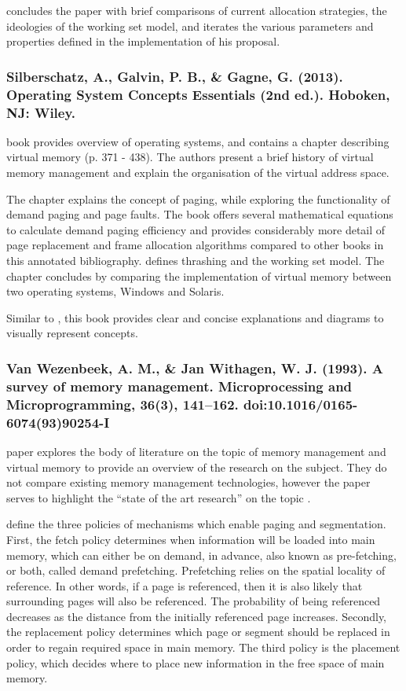 \citet{Denning1967} concludes the paper with brief comparisons of current allocation strategies, the ideologies of the working set model, and iterates the various parameters and properties defined in the implementation of his proposal.

\subsubsection*{Silberschatz, A., Galvin, P. B., \& Gagne, G. (2013). Operating System Concepts Essentials (2nd ed.). Hoboken, NJ: Wiley.}

 book provides overview of operating systems, and contains a chapter describing virtual memory (p. 371 - 438). The authors present a brief history of virtual memory management and explain the organisation of the virtual address space.

The chapter explains the concept of paging, while exploring the functionality of demand paging and page faults. The book offers several mathematical equations to calculate demand paging efficiency and provides considerably more detail of page replacement and frame allocation algorithms compared to other books in this annotated bibliography. \citet{Silberschatz2013} defines thrashing and the working set model. The chapter concludes by comparing the implementation of virtual memory between two operating systems, Windows and Solaris.

Similar to \citet{Jacob2008}, this book provides clear and concise explanations and diagrams to visually represent concepts.

\subsubsection*{Van Wezenbeek, A. M., \& Jan Withagen, W. J. (1993). A survey of memory management. Microprocessing and Microprogramming, 36(3), 141–162. doi:10.1016/0165-6074(93)90254-I}

 paper explores the body of literature on the topic of memory management and virtual memory to provide an overview of the research on the subject. They do not compare existing memory management technologies, however the paper serves to highlight the ``state of the art research'' on the topic \citep[p. 141]{VanWezenbeek1993}.

\citet{VanWezenbeek1993} define the three policies of mechanisms which enable paging and segmentation. First, the fetch policy determines when information will be loaded into main memory, which can either be on demand, in advance, also known as pre-fetching, or both, called demand prefetching. Prefetching relies on the spatial locality of reference. In other words, if a page is referenced, then it is also likely that surrounding pages will also be referenced. The probability of being referenced decreases as the distance from the initially referenced page increases. Secondly, the replacement policy determines which page or segment should be replaced in order to regain required space in main memory. The third policy is the placement policy, which decides where to place new information in the free space of main memory.

